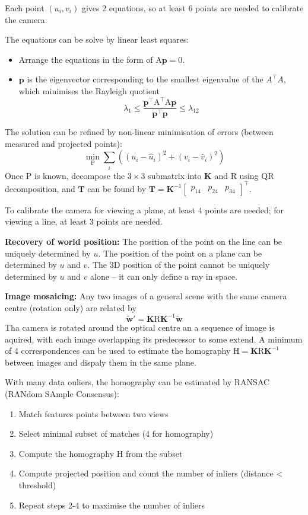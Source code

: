 \documentclass[12pt]{article}
\begin{document}
Each point $(u_i, v_i)$ gives 2 equations, so at least 6 points are needed to calibrate the camera.

The equations can be solve by linear least squares:
\begin{itemize}
    \item Arrange the equations in the form of $\mathrm{A} \mathbf{p} = 0$. 
    \item $\mathbf{p}$ is the eigenvector corresponding to the smallest eigenvalue of the $A^\top A$, which minimises the Rayleigh quotient
    $$
    \lambda_1 \leq \frac{\mathbf{p}^\top \mathrm{A}^\top \mathrm{A} \mathbf{p}}{\mathbf{p}^\top \mathbf{p}} \leq \lambda_{12}
    $$
\end{itemize}

The solution can be refined by non-linear minimisation of errors (between measured and projected points):
$$
\min_{\mathrm{P}} \sum_i ((u_i - \hat{u}_i)^2 + (v_i - \hat{v}_i)^2)
$$
Once $\mathrm{P}$ is known, decompose the $3\times 3$ submatrix into $\mathbf{K}$ and $\mathrm{R}$ using QR decomposition, and $\mathbf{T}$ can be found by $\mathbf{T} = \mathbf{K}^{-1} \begin{bmatrix}
    p_{14} & p_{24} & p_{34}
\end{bmatrix}^\top$.

To calibrate the camera for viewing a plane, at least 4 points are needed; for viewing a line, at least 3 points are needed.

\textbf{Recovery of world position:} The position of the point on the line can be uniquely determined by $u$. The position of the point on a plane can be determined by $u$ and $v$. The 3D position of the point cannot be uniquely determined by $u$ and $v$ alone -- it can only define a ray in space.

\textbf{Image mosaicing:} Any two images of a general scene with the same camera centre (rotation only) are related by
$$
\mathbf{\tilde{w}}' = \mathbf{K} \mathrm{R} \mathbf{K}^{-1} \mathbf{\tilde{w}}
$$
Tha camera is rotated around the optical centre an a sequence of image is aquired, with each image overlapping its predecessor to some extend. A minimum of 4 correspondences can be used to estimate the homography $\mathrm{H} = \mathbf{K} \mathrm{R} \mathbf{K}^{-1}$ between images and dispaly them in the same plane.

With many data ouliers, the homography can be estimated by RANSAC (RANdom SAmple Consensus):
\begin{enumerate}
    \item Match features points between two views
    \item Select minimal subset of matches (4 for homography)
    \item Compute the homography $\mathrm{H}$ from the subset
    \item Compute projected position and count the number of inliers (distance < threshold)
    \item Repeat steps 2-4 to maximise the number of inliers
\end{enumerate}
\end{document}
